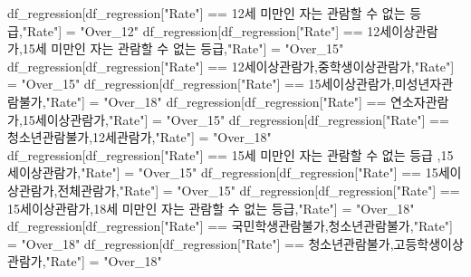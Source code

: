 \documentclass[
]{article}
\newenvironment{Shaded}{\begin{snugshade}}{\end{snugshade}}
\newcommand{\NormalTok}[1]{#1}
\newcommand{\OtherTok}[1]{\textcolor[rgb]{0.56,0.35,0.01}{#1}}
\newcommand{\SpecialCharTok}[1]{\textcolor[rgb]{0.00,0.00,0.00}{#1}}
\newcommand{\StringTok}[1]{\textcolor[rgb]{0.31,0.60,0.02}{#1}}
\begin{document}
\begin{Shaded}
\begin{Highlighting}[]
\NormalTok{df\_regression[df\_regression[}\StringTok{"Rate"}\NormalTok{] }\SpecialCharTok{==} \StringTok{\textquotesingle{}12세 미만인 자는 관람할 수 없는 등급\textquotesingle{}}\NormalTok{,}\StringTok{"Rate"}\NormalTok{] }\OtherTok{=} \StringTok{"Over\_12"}
\NormalTok{df\_regression[df\_regression[}\StringTok{"Rate"}\NormalTok{] }\SpecialCharTok{==} \StringTok{\textquotesingle{}12세이상관람가,15세 미만인 자는 관람할 수 없는 등급\textquotesingle{}}\NormalTok{,}\StringTok{"Rate"}\NormalTok{] }\OtherTok{=} \StringTok{"Over\_15"}
\NormalTok{df\_regression[df\_regression[}\StringTok{"Rate"}\NormalTok{] }\SpecialCharTok{==} \StringTok{\textquotesingle{}12세이상관람가,중학생이상관람가\textquotesingle{}}\NormalTok{,}\StringTok{"Rate"}\NormalTok{] }\OtherTok{=} \StringTok{"Over\_15"}
\NormalTok{df\_regression[df\_regression[}\StringTok{"Rate"}\NormalTok{] }\SpecialCharTok{==} \StringTok{\textquotesingle{}15세이상관람가,미성년자관람불가\textquotesingle{}}\NormalTok{,}\StringTok{"Rate"}\NormalTok{] }\OtherTok{=} \StringTok{"Over\_18"}
\NormalTok{df\_regression[df\_regression[}\StringTok{"Rate"}\NormalTok{] }\SpecialCharTok{==} \StringTok{\textquotesingle{}연소자관람가,15세이상관람가\textquotesingle{}}\NormalTok{,}\StringTok{"Rate"}\NormalTok{] }\OtherTok{=} \StringTok{"Over\_15"}
\NormalTok{df\_regression[df\_regression[}\StringTok{"Rate"}\NormalTok{] }\SpecialCharTok{==} \StringTok{\textquotesingle{}청소년관람불가,12세관람가\textquotesingle{}}\NormalTok{,}\StringTok{"Rate"}\NormalTok{] }\OtherTok{=} \StringTok{"Over\_18"}
\NormalTok{df\_regression[df\_regression[}\StringTok{"Rate"}\NormalTok{] }\SpecialCharTok{==} \StringTok{\textquotesingle{}15세 미만인 자는 관람할 수 없는 등급 ,15세이상관람가\textquotesingle{}}\NormalTok{,}\StringTok{"Rate"}\NormalTok{] }\OtherTok{=} \StringTok{"Over\_15"}
\NormalTok{df\_regression[df\_regression[}\StringTok{"Rate"}\NormalTok{] }\SpecialCharTok{==} \StringTok{\textquotesingle{}15세이상관람가,전체관람가\textquotesingle{}}\NormalTok{,}\StringTok{"Rate"}\NormalTok{] }\OtherTok{=} \StringTok{"Over\_15"}
\NormalTok{df\_regression[df\_regression[}\StringTok{"Rate"}\NormalTok{] }\SpecialCharTok{==} \StringTok{\textquotesingle{}15세이상관람가,18세 미만인 자는 관람할 수 없는 등급\textquotesingle{}}\NormalTok{,}\StringTok{"Rate"}\NormalTok{] }\OtherTok{=} \StringTok{"Over\_18"}
\NormalTok{df\_regression[df\_regression[}\StringTok{"Rate"}\NormalTok{] }\SpecialCharTok{==} \StringTok{\textquotesingle{}국민학생관람불가,청소년관람불가\textquotesingle{}}\NormalTok{,}\StringTok{"Rate"}\NormalTok{] }\OtherTok{=} \StringTok{"Over\_18"}
\NormalTok{df\_regression[df\_regression[}\StringTok{"Rate"}\NormalTok{] }\SpecialCharTok{==} \StringTok{\textquotesingle{}청소년관람불가,고등학생이상관람가\textquotesingle{}}\NormalTok{,}\StringTok{"Rate"}\NormalTok{] }\OtherTok{=} \StringTok{"Over\_18"}

\end{Highlighting}
\end{Shaded}
\end{document}
